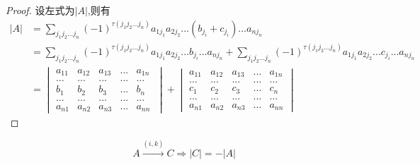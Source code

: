 \documentclass[blue,normal,cn]{elegantnote}
\begin{document}
\begin{proof}

    设左式为$|A|$,则有
    \begin{equation*}
        \begin{aligned}
            |A|&=\sum_{j_1j_2...j_n}(-1)^{\tau(j_1 j_2...j_n)}a_{1 j_1}a_{2 j_2}...(b_{j_i}+c_{j_i})...a_{n j_n}\\
               &=\sum_{j_1j_2...j_n}(-1)^{\tau(j_1 j_2...j_n)}a_{1 j_1}a_{2 j_2}...b_{j_i}...a_{n j_n}+
                 \sum_{j_1j_2...j_n}(-1)^{\tau(j_1 j_2...j_n)}a_{1 j_1}a_{2 j_2}...c_{j_i}...a_{n j_n}\\
               &=
               \begin{vmatrix} 
                a_{11}&a_{12} & a_{13} &...& a_{1n}\\
                ...&...&...&...&...\\
                b_1&b_2 & b_3 &...& b_n\\
                ...&...&...&...&...\\
                a_{n1}&a_{n2} & a_{n3} &...& a_{nn}\
                \end{vmatrix}
                +
                \begin{vmatrix} 
                    a_{11}&a_{12} & a_{13} &...& a_{1n}\\
                    ...&...&...&...&...\\
                    c_1&c_2 & c_3 &...& c_n\\
                    ...&...&...&...&...\\
                    a_{n1}&a_{n2} & a_{n3} &...& a_{nn}
                \end{vmatrix}
        \end{aligned}
    \end{equation*}
\end{proof}

\begin{property}
    \begin{equation*}
        A\stackrel{(i,k)}{\longrightarrow}C \Rightarrow |C|=-|A|
    \end{equation*}
\end{property}
\end{document}
